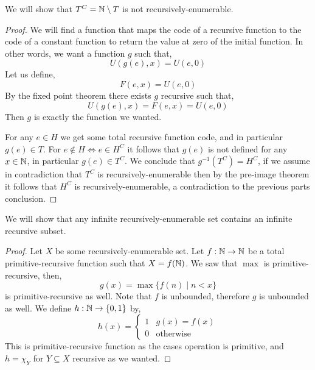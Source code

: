 \subquestion{}
We will show that $T^C = \mathbb{N} \setminus T$ is not recursively-enumerable.
\begin{proof}
	We will find a function that maps the code of a recursive function to the code of a constant function to return the value at zero of the initial function.
	In other words, we want a function $g$ such that,
	\[
		U(g(e), x)
		= U(e, 0)
	\]
	Let us define,
	\[
		F(e, x)
		= U(e, 0)
	\]
	By the fixed point theorem there exists $g$ recursive such that,
	\[
		U(g(e), x)
		= F(e, x)
		= U(e, 0)
	\]
	Then $g$ is exactly the function we wanted.

	For any $e \in H$ we get some total recursive function code, and in particular $g(e) \in T$.
	For $e \notin H \iff e \in H^C$ it follows that $g(e)$ is not defined for any $x \in \mathbb{N}$, in particular $g(e) \in T^C$.
	We conclude that $g^{-1}(T^C) = H^C$, if we assume in contradiction that $T^C$ is recursively-enumerable then by the pre-image theorem it follows that $H^C$ is recursively-enumerable,
	a contradiction to the previous parts conclusion.
\end{proof}

\question{}
We will show that any infinite recursively-enumerable set contains an infinite recursive subset.
\begin{proof}
	Let $X$ be some recursively-enumerable set.
	Let $f : \mathbb{N} \to \mathbb{N}$ be a total primitive-recursive function such that $X = f(\mathbb{N})$.
	We saw that $\max$ is primitive-recursive, then,
	\[
		g(x) = \max \{ f(n) \mid n < x \}
	\]
	is primitive-recursive as well.
	Note that $f$ is unbounded, therefore $g$ is unbounded as well.
	We define $h : \mathbb{N} \to \{ 0, 1\}$ by,
	\[
		h(x)
		= \begin{cases}
			1 & g(x) = f(x) \\
			0 & \text{otherwise}
		\end{cases}
	\]
	This is primitive-recursive function as the cases operation is primitive, and $h = \chi_Y$ for $Y \subseteq X$ recursive as we wanted.
\end{proof}

